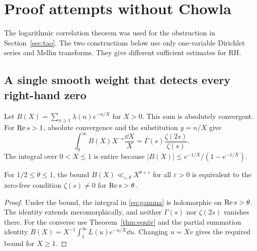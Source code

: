 \section{Proof attempts without Chowla}\label{sec:bypass}

The logarithmic correlation theorem was used for the obstruction in Section~\ref{sec:tao}. The two constructions below use only one-variable Dirichlet series and Mellin transforms. They give different sufficient estimates for RH.

\subsection{A single smooth weight that detects every right-hand zero}

Let \(B(X)=\sum_{n\ge1}\lambda(n)e^{-n/X}\) for \(X>0\). This sum is absolutely convergent. For \(\operatorname{Re} s>1\), absolute convergence and the substitution \(y=n/X\) give
\begin{equation}\label{eq:gamma}
 \int_0^\infty B(X)X^{-s}\frac{\dd X}{X}
 =\Gamma(s)\frac{\zeta(2s)}{\zeta(s)}.
\end{equation}
The integral over \(0<X\le1\) is entire because \(|B(X)|\le e^{-1/X}/(1-e^{-1/X})\).

\begin{proposition}\label{prop:smoothed}
For \(1/2\le\theta\le1\), the bound \(B(X)\ll_{\varepsilon,\theta}X^{\theta+\varepsilon}\) for all \(\varepsilon>0\) is equivalent to the zero-free condition \(\zeta(s)\ne0\) for \(\operatorname{Re} s>\theta\).
\end{proposition}
\begin{proof}
Under the bound, the integral in \eqref{eq:gamma} is holomorphic on \(\operatorname{Re} s>\theta\). The identity extends meromorphically, and neither \(\Gamma(s)\) nor \(\zeta(2s)\) vanishes there. For the converse use Theorem~\ref{thm:equiv} and the partial summation identity
\(
 B(X)=X^{-1}\int_1^\infty L(u)e^{-u/X}\dd u.
\)
Changing \(u=Xv\) gives the required bound for \(X\ge1\).
\end{proof}

